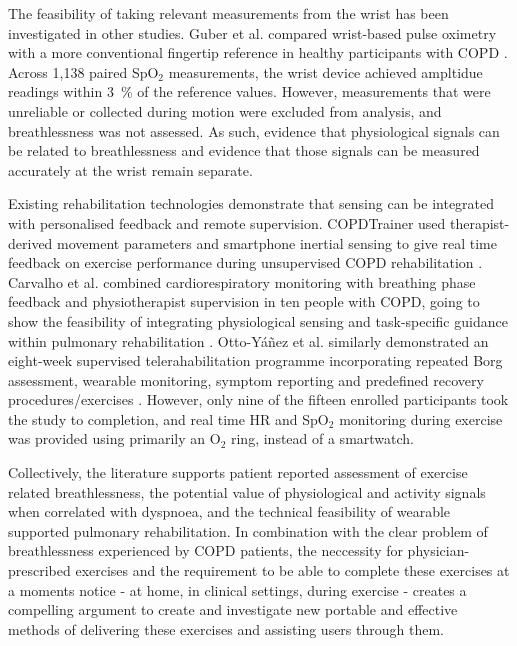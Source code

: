 The feasibility of taking relevant measurements from the wrist has been investigated in other studies. Guber et al. compared wrist-based pulse oximetry with a more conventional fingertip reference in healthy participants with COPD \cite{guberWristSensorPulseOximeter2019}. Across 1,138 paired SpO\(_2\) measurements, the wrist device achieved ampltidue readings within \qty{3}{\percent} of the reference values. However, measurements that were unreliable or collected during motion were excluded from analysis, and breathlessness was not assessed. As such, evidence that physiological signals can be related to breathlessness and evidence that those signals can be measured accurately at the wrist remain separate.

Existing rehabilitation technologies demonstrate that sensing can be integrated with personalised feedback and remote supervision. COPDTrainer used therapist-derived movement parameters and smartphone inertial sensing to give real time feedback on exercise performance during unsupervised COPD rehabilitation \cite{spinaCOPDTrainerSmartphonebasedMotion2013}. Carvalho et al. combined cardiorespiratory monitoring with breathing phase feedback and physiotherapist supervision in ten people with COPD, going to show the feasibility of integrating physiological sensing and task-specific guidance within pulmonary rehabilitation \cite{carvalhoCaseStudyCOPD2026}. Otto-Yáñez et al. similarly demonstrated an eight-week supervised telerahabilitation programme incorporating repeated Borg assessment, wearable monitoring, symptom reporting and predefined recovery procedures/exercises \cite{otto-yanezPulmonaryTelerehabilitationTelemonitoring2026}. However, only nine of the fifteen enrolled participants took the study to completion, and real time HR and SpO\(_2\) monitoring during exercise was provided using primarily an O\(_2\) ring, instead of a smartwatch.

Collectively, the literature supports patient reported assessment of exercise related breathlessness, the potential value of physiological and activity signals when correlated with dyspnoea, and the technical feasibility of wearable supported pulmonary rehabilitation. In combination with the clear problem of breathlessness experienced by COPD patients, the neccessity for physician-prescribed exercises and the requirement to be able to complete these exercises at a moments notice - at home, in clinical settings, during exercise - creates a compelling argument to create and investigate new portable and effective methods of delivering these exercises and assisting users through them.
